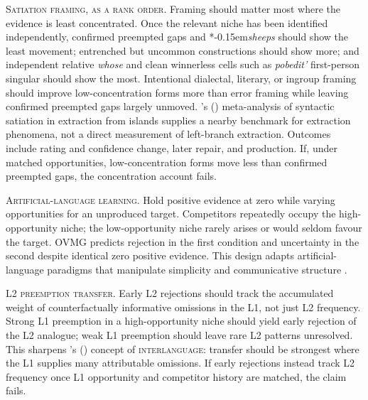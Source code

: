 \documentclass[12pt,letterpaper]{article}
\newcommand{\term}[1]{\textsc{#1}}
\newcommand{\mention}[1]{\textit{#1}}
\newcommand{\judgesep}{\kern-0.15em}
\newcommand{\ungram}[1]{*\judgesep#1}
\newcommand{\posscite}[1]{\citeauthor{#1}'s (\citeyear{#1})}
\begin{document}
\noindent\textsc{Satiation framing, as a rank order.} Framing should matter most
where the evidence is least concentrated. Once the relevant niche has been
identified independently, confirmed preempted gaps and
\ungram{\mention{sheeps}} should show the least movement; entrenched but uncommon
constructions should show more; and independent relative \mention{whose} and
clean winnerless cells such as \mention{pobedit'} first-person singular should
show the most. Intentional dialectal, literary, or ingroup framing should improve
low-concentration forms more than error framing while leaving confirmed
preempted gaps largely unmoved.
\posscite{Lu2024} meta-analysis of syntactic satiation in extraction from
islands supplies a nearby benchmark for extraction phenomena, not a direct
measurement of left-branch extraction.
Outcomes include rating and confidence change, later repair, and production. If,
under matched opportunities, low-concentration forms move less than confirmed
preempted gaps, the concentration account fails.

\noindent\textsc{Artificial-language learning.} Hold positive evidence at zero
while varying opportunities for an unproduced target. Competitors repeatedly
occupy the high-opportunity niche; the low-opportunity niche rarely arises or
would seldom favour the target. OVMG predicts rejection in the first condition
and uncertainty in the second despite identical zero positive evidence. This
design adapts artificial-language paradigms that manipulate simplicity and
communicative structure \autocite{culbertson2016simplicity}.

\noindent\textsc{L2 preemption transfer.} Early L2 rejections should track the
accumulated weight of counterfactually informative omissions in the L1, not
just L2 frequency. Strong L1 preemption in a high-opportunity niche should yield
early rejection of the L2 analogue; weak L1 preemption should leave rare L2
patterns unresolved. This sharpens \posscite{selinker1972} concept of
\term{interlanguage}: transfer should be strongest where the L1 supplies many
attributable omissions. If early rejections instead track L2 frequency once L1
opportunity and competitor history are matched, the claim fails.
\end{document}
